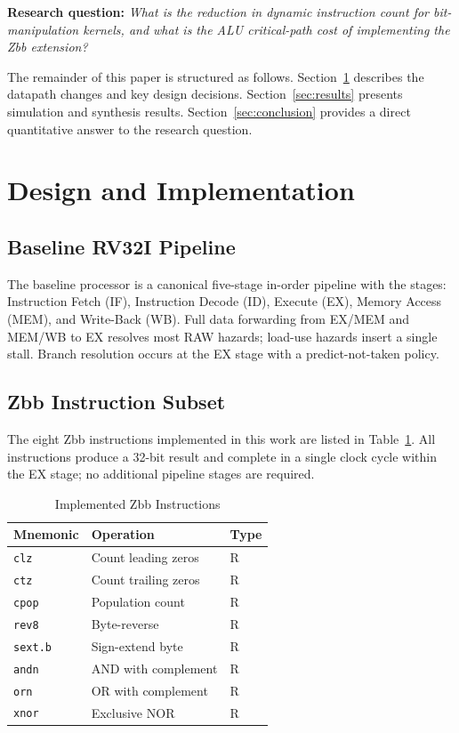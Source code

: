 \documentclass[conference]{IEEEtran}
\begin{document}
	\textbf{Research question:}
	\textit{What is the reduction in dynamic instruction count for
		bit-manipulation kernels, and what is the ALU critical-path cost
		of implementing the Zbb extension?}
	
	The remainder of this paper is structured as follows.
	Section~\ref{sec:design} describes the datapath changes and key design
	decisions.
	Section~\ref{sec:results} presents simulation and synthesis results.
	Section~\ref{sec:conclusion} provides a direct quantitative answer to the
	research question.
	
	\section{Design and Implementation}
	\label{sec:design}
	
	\subsection{Baseline RV32I Pipeline}
	
	The baseline processor is a canonical five-stage in-order pipeline with
	the stages: Instruction Fetch (IF), Instruction Decode (ID), Execute (EX),
	Memory Access (MEM), and Write-Back (WB).
	Full data forwarding from EX/MEM and MEM/WB to EX resolves most RAW hazards;
	load-use hazards insert a single stall.
	Branch resolution occurs at the EX stage with a predict-not-taken policy.
	
	\subsection{Zbb Instruction Subset}
	
	The eight Zbb instructions implemented in this work are listed in
	Table~\ref{tab:zbb_insts}.
	All instructions produce a 32-bit result and complete in a single clock
	cycle within the EX stage; no additional pipeline stages are required.
	
	\begin{table}[h]
		\centering
		\caption{Implemented Zbb Instructions}
		\label{tab:zbb_insts}
		\begin{tabular}{lll}
			\toprule
			\textbf{Mnemonic} & \textbf{Operation} & \textbf{Type} \\
			\midrule
			\texttt{clz}    & Count leading zeros          & R \\
			\texttt{ctz}    & Count trailing zeros         & R \\
			\texttt{cpop}   & Population count             & R \\
			\texttt{rev8}   & Byte-reverse                 & R \\
			\texttt{sext.b} & Sign-extend byte             & R \\
			\texttt{andn}   & AND with complement          & R \\
			\texttt{orn}    & OR with complement           & R \\
			\texttt{xnor}   & Exclusive NOR                & R \\
			\bottomrule
		\end{tabular}
	\end{table}
	
\end{document}
